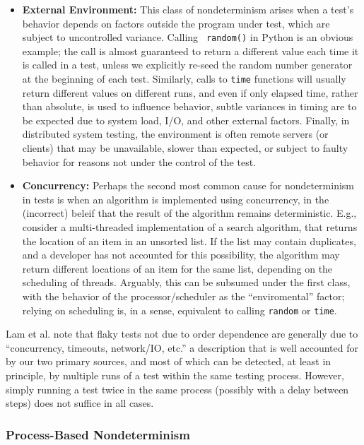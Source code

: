 \begin{itemize}
\item {\bf External Environment:} This class of nondeterminism arises
  when a test's behavior depends on factors outside the program under
  test, which are subject to uncontrolled variance.  Calling {\tt
    random()} in Python is an obvious example; the call is almost
  guaranteed to return a different value each time it is called in a
  test, unless we explicitly re-seed the random number generator at
  the beginning of each test.  Similarly, calls to {\tt time}
  functions  will usually return different values on different runs,
  and even if only elapsed time, rather than absolute, is used to
  influence behavior, subtle variances in timing are to be expected
  due to system load, I/O, and other external factors.  Finally, in
  distributed system testing, the environment is often remote servers
  (or clients) that may be unavailable, slower than expected, or
  subject to faulty behavior for reasons not under the control of the
  test.
\item {\bf Concurrency:} Perhaps the second most common cause for
  nondeterminism in tests is when an algorithm is implemented using
  concurrency, in the (incorrect) beleif that the result of the
  algorithm remains deterministic.  E.g., consider a multi-threaded
  implementation of a search algorithm, that returns the location of
  an item in an unsorted list.  If the list may contain duplicates,
  and a developer has not accounted for this possibility, the
  algorithm may return different locations of an item for the same list,
  depending on the scheduling of threads.  Arguably, this can be
  subsumed under the first class, with the behavior of the
  processor/scheduler as the ``enviromental'' factor; relying on
  scheduling is, in a sense, equivalent to calling {\tt random} or
  {\tt time}.
\end{itemize}

Lam et al. \cite{idflakies} note that flaky tests not due to order
dependence are generally due to ``concurrency, timeouts,
network/IO, etc.'' a description that is well accounted for by our two
primary sources, and most of which can be detected, at least in
principle, by multiple runs of a test within the same testing process.  However, simply running a test twice in the same process (possibly with a delay between steps) does
not suffice in all cases.

\subsubsection{Process-Based Nondeterminism}

